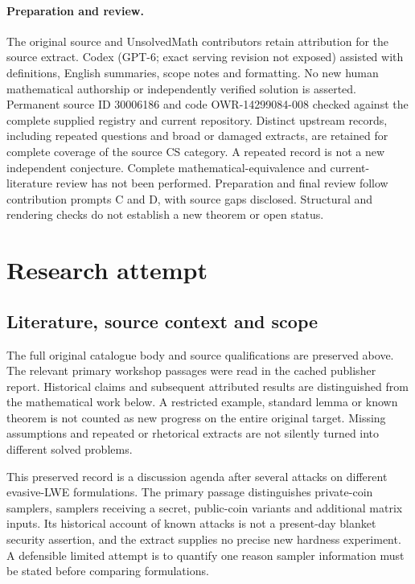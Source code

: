 \documentclass[11pt]{article}
\begin{document}
\paragraph{Preparation and review.}
The original source and UnsolvedMath contributors retain attribution for the source extract. Codex (GPT-6; exact serving revision not exposed) assisted with definitions, English summaries, scope notes and formatting. No new human mathematical authorship or independently verified solution is asserted. Permanent source ID 30006186 and code OWR-14299084-008 checked against the complete supplied registry and current repository. Distinct upstream records, including repeated questions and broad or damaged extracts, are retained for complete coverage of the source CS category. A repeated record is not a new independent conjecture. Complete mathematical-equivalence and current-literature review has not been performed. Preparation and final review follow contribution prompts C and D, with source gaps disclosed. Structural and rendering checks do not establish a new theorem or open status.
\label{end:30006186}

\section{Research attempt}
\subsection{Literature, source context and scope}
The full original catalogue body and source qualifications are preserved above. The relevant primary workshop passages were read in the cached publisher report. Historical claims and subsequent attributed results are distinguished from the mathematical work below. A restricted example, standard lemma or known theorem is not counted as new progress on the entire original target. Missing assumptions and repeated or rhetorical extracts are not silently turned into different solved problems.

This preserved record is a discussion agenda after several attacks on different evasive-LWE formulations. The primary passage distinguishes private-coin samplers, samplers receiving a secret, public-coin variants and additional matrix inputs. Its historical account of known attacks is not a present-day blanket security assertion, and the extract supplies no precise new hardness experiment. A defensible limited attempt is to quantify one reason sampler information must be stated before comparing formulations.
\end{document}
